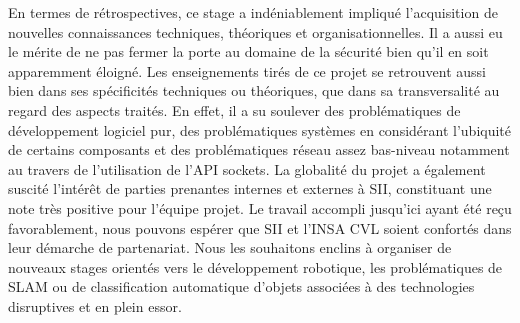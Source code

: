 En termes de rétrospectives, ce stage a indéniablement impliqué l'acquisition de nouvelles connaissances techniques, théoriques et organisationnelles. 
Il a aussi eu le mérite de ne pas fermer la porte au domaine de la sécurité bien qu'il en soit apparemment éloigné. 
Les enseignements tirés de ce projet se retrouvent aussi bien dans ses spécificités techniques ou théoriques, que dans sa transversalité au regard des aspects traités.
En effet, il a su soulever des problématiques de développement logiciel pur, des problématiques systèmes en considérant l'ubiquité de certains composants et des problématiques réseau assez bas-niveau notamment au travers de l'utilisation de l'API sockets. 
La globalité du projet a également suscité l'intérêt de parties prenantes internes et externes à SII, constituant une note très positive pour l'équipe projet. 
Le travail accompli jusqu'ici ayant été reçu favorablement, nous pouvons espérer que SII et l'INSA CVL soient confortés dans leur démarche de partenariat. 
Nous les souhaitons enclins à organiser de nouveaux stages orientés vers le développement robotique, les problématiques de \gls{SLAM} ou de classification automatique d'objets associées à des technologies disruptives et en plein essor.
